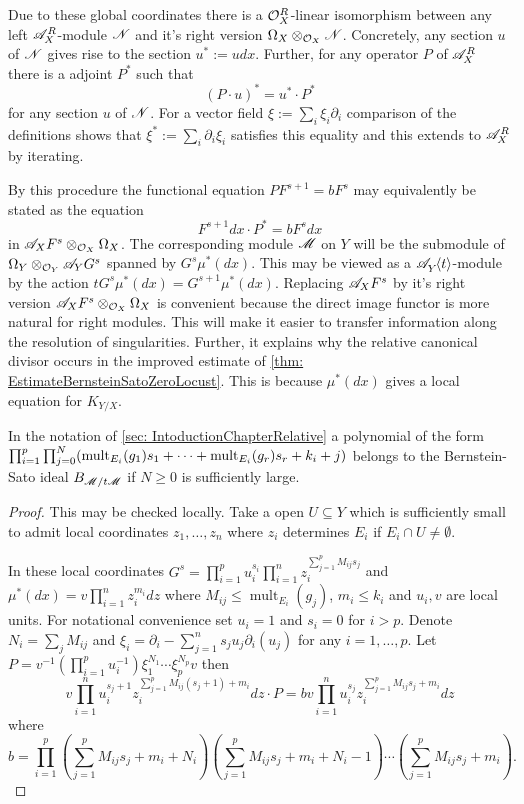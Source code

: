 Due to these global coordinates there is a $\mathcal{O}_X^R$-linear isomorphism between any left $\mathscr{A}_X^R$-module $\mathscr{N}$ and it's right version $\Omega_X \otimes_{\mathcal{O}_X}\mathscr{N}$. Concretely, any section $u$ of $\mathscr{N}$ gives rise to the section $u^* := u dx$. Further, for any operator $P$ of $\mathscr{A}_X^R$ there is a adjoint $P^*$ such that
$$(P\cdot u)^* =   u^* \cdot P^*$$
for any section $u$ of $\mathscr{N}$. For a vector field $\xi := \sum_i\xi_i \partial_i$ comparison of the definitions shows that $\xi^* := \sum_i\partial_i\xi_i$ satisfies this equality and this extends to $\mathscr{A}_X^R$ by iterating.

By this procedure the functional equation $P F^{s+1} = b F^s$ may equivalently be stated as the equation
$$F^{s+1}dx \cdot P^* = b F^s dx $$
in $\mathscr{A}_X F^s \otimes_{\mathcal{O}_X}\Omega_X$.
The corresponding module $\mathscr{M}$ on $Y$ will be the submodule of $\Omega_Y\otimes_{\mathcal{O}_Y} \mathscr{A}_Y G^s$ spanned by $G^s \mu^*(dx)$.
This may be viewed as a $\mathscr{A}_{Y}^{}\mkern-5mu\left\langle t \right\rangle$-module by the action $t G^s \mu^*(dx) = G^{s+1} \mu^*(dx)$.
Replacing $\mathscr{A}_XF^s$ by it's right version $\mathscr{A}_XF^s \otimes_{\mathcal{O}_X}\Omega_X$ is convenient because the direct image functor is more natural for right modules.
This will make it easier to transfer information along the resolution of singularities.
Further, it explains why the relative canonical divisor occurs in the improved estimate of \cref{thm: EstimateBernsteinSatoZeroLocust}.
This is because $\mu^*(dx)$ gives a local equation for $K_{Y/X}$.
\begin{lemma}\label{lem: BernsteinSatoPolynomialUpstairs}
  In the notation of \cref{sec: IntoductionChapterRelative} a polynomial of the form
  $\prod_{i=1}^p \prod_{j=0}^N(\operatorname{mult}_{E_i}(g_1)\allowbreak s_1 + \cdots + \operatorname{mult}_{E_i}(g_r)\allowbreak s_r + k_i + j)$
  belongs to the Bernstein-Sato ideal $B_{\mathscr{M}/t\mathscr{M}}$ if $N\geq 0$ is sufficiently large.
\end{lemma}
\begin{proof}
  This may be checked locally.
  Take a open $U\subseteq Y$ which is sufficiently small to admit local coordinates $z_1,\ldots,z_n$ where $z_i$ determines $E_i$ if $E_i\cap U \neq \emptyset$.

  In these local coordinates $G^s = \prod_{i=1}^p u_i^{s_i} \prod_{i=1}^nz_i^{\sum_{j=1}^p M_{ij}s_j}$ and $\mu^*(dx) = v \prod_{i=1}^n z_i^{m_i} dz$ where $M_{ij} \leq \operatorname{mult}_{E_i}(g_j)$, $m_i \leq k_i$ and $u_i,v$ are local units.
  For notational convenience set $u_i=1$ and $s_i=0$ for $i>p$.
  Denote $N_i = \sum_j M_{ij}$ and $\xi_i = \partial_i - \sum_{j=1}^n s_ju_j \partial_i(u_j)$ for any $i=1,\ldots,p$.
  Let $P = v^{-1}(\prod_{i=1}^p u_i^{-1})\xi_1^{N_1} \cdots \xi_p^{N_p} v$ then
  $$v\prod_{i=1}^n u_i^{s_j + 1}z_i^{\sum_{j=1}^p M_{ij}(s_j+1) + m_i}dz \cdot P =  b v \prod_{i=1}^nu_i^{s_j}z_i^{\sum_{j=1}^p M_{ij}s_j + m_i}dz $$
  where
  $$b = \prod_{i=1}^p(\sum_{j=1}^p M_{ij}s_j + m_i + N_i)(\sum_{j=1}^p M_{ij}s_j + m_i + N_i - 1)\cdots(\sum_{j=1}^p M_{ij}s_j + m_i).$$
\end{proof}

